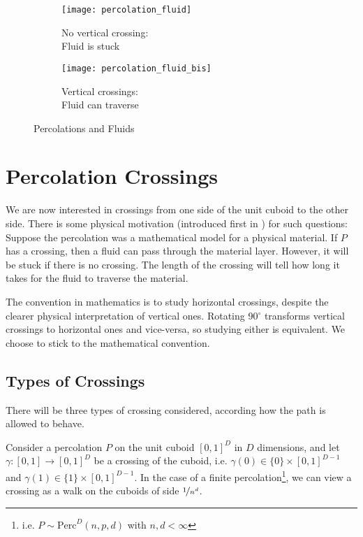 \begin{wrapfigure}{r}{8.7cm}
	\vspace{-0.75cm}
	\begin{subfigure}{4.3cm}
		\texttt{[image: percolation\_fluid]}
		\centering
		\captionsetup{justification=centering}
		\caption{No vertical crossing: \\Fluid is stuck}
		\label{fig:percolationFluidNoCrossing}
	\end{subfigure}
	\begin{subfigure}{4.2cm}
		\texttt{[image: percolation\_fluid\_bis]}
		\centering
		\captionsetup{justification=centering}
		\caption{Vertical crossings: \\Fluid can traverse}
		\label{fig:percolationFluidCrossing}
	\end{subfigure}
	\centering
	\caption{Percolations and Fluids}
	\label{fig:percolationFluid}
\end{wrapfigure}
\section{Percolation Crossings}
We are now interested in crossings from one side of the unit cuboid to the other side.
There is some physical motivation (introduced first in \cite{broadbent_hammersley_1957}) for such questions:
Suppose the percolation was a mathematical model for a physical material.
If $P$ has a crossing, then a fluid can pass through the material layer.
However, it will be stuck if there is no crossing.
The length of the crossing will tell how long it takes for the fluid to traverse the material.

The convention in mathematics is to study horizontal crossings, despite the clearer physical interpretation of vertical ones.
Rotating 90$^{\circ}$ transforms vertical crossings to horizontal ones and vice-versa, so studying either is equivalent.
We choose to stick to the mathematical convention.

\subsection{Types of Crossings}
There will be three types of crossing considered, according how the path is allowed to behave.

Consider a percolation $P$ on the unit cuboid $\left[ 0,1 \right]^D$ in $D$ dimensions, and let $\gamma: \left[ 0,1 \right] \to \left[ 0,1 \right]^D$ be a crossing of the cuboid, i.e. $\gamma(0) \in \{ 0 \} \times \left[ 0,1 \right]^{D-1}$ and $\gamma(1) \in \{ 1 \} \times \left[ 0,1 \right]^{D-1}$.
In the case of a finite percolation\footnote{i.e. $P \sim \text{Perc}^D(n,p,d)$ with $n,d < \infty$}, we can view a crossing as a walk on the cuboids of side $\nicefrac{1}{n^d}$.

